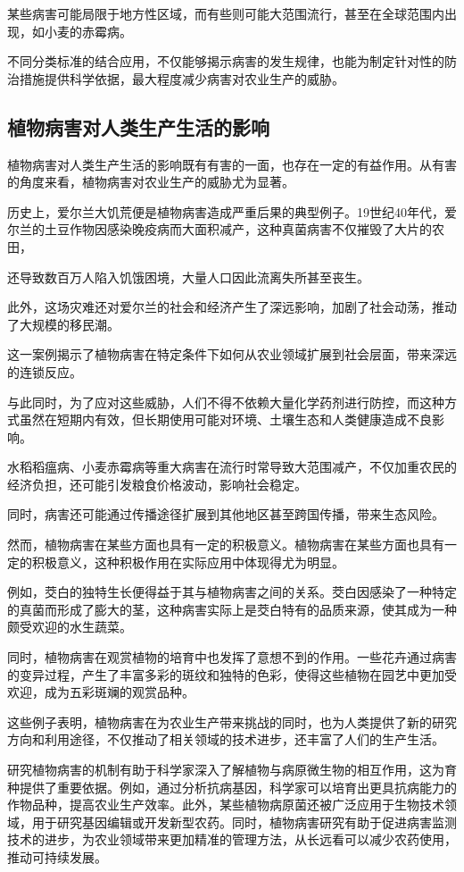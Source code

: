 \documentclass[AutoFakeBold]{LZUThesis-PgD&PhD}
\begin{document}
某些病害可能局限于地方性区域，而有些则可能大范围流行，甚至在全球范围内出现，如小麦的赤霉病。


不同分类标准的结合应用，不仅能够揭示病害的发生规律，也能为制定针对性的防治措施提供科学依据，最大程度减少病害对农业生产的威胁。

\subsection{植物病害对人类生产生活的影响}

植物病害对人类生产生活的影响既有有害的一面，也存在一定的有益作用。从有害的角度来看，植物病害对农业生产的威胁尤为显著。

历史上，爱尔兰大饥荒便是植物病害造成严重后果的典型例子。19世纪40年代，爱尔兰的土豆作物因感染晚疫病而大面积减产，这种真菌病害不仅摧毁了大片的农田，

还导致数百万人陷入饥饿困境，大量人口因此流离失所甚至丧生。


此外，这场灾难还对爱尔兰的社会和经济产生了深远影响，加剧了社会动荡，推动了大规模的移民潮。


这一案例揭示了植物病害在特定条件下如何从农业领域扩展到社会层面，带来深远的连锁反应。

与此同时，为了应对这些威胁，人们不得不依赖大量化学药剂进行防控，而这种方式虽然在短期内有效，但长期使用可能对环境、土壤生态和人类健康造成不良影响。

水稻稻瘟病、小麦赤霉病等重大病害在流行时常导致大范围减产，不仅加重农民的经济负担，还可能引发粮食价格波动，影响社会稳定。

同时，病害还可能通过传播途径扩展到其他地区甚至跨国传播，带来生态风险。

然而，植物病害在某些方面也具有一定的积极意义。植物病害在某些方面也具有一定的积极意义，这种积极作用在实际应用中体现得尤为明显。

例如，茭白的独特生长便得益于其与植物病害之间的关系。茭白因感染了一种特定的真菌而形成了膨大的茎，这种病害实际上是茭白特有的品质来源，使其成为一种颇受欢迎的水生蔬菜。

同时，植物病害在观赏植物的培育中也发挥了意想不到的作用。一些花卉通过病害的变异过程，产生了丰富多彩的斑纹和独特的色彩，使得这些植物在园艺中更加受欢迎，成为五彩斑斓的观赏品种。

这些例子表明，植物病害在为农业生产带来挑战的同时，也为人类提供了新的研究方向和利用途径，不仅推动了相关领域的技术进步，还丰富了人们的生产生活。

研究植物病害的机制有助于科学家深入了解植物与病原微生物的相互作用，这为育种提供了重要依据。例如，通过分析抗病基因，科学家可以培育出更具抗病能力的作物品种，提高农业生产效率。此外，某些植物病原菌还被广泛应用于生物技术领域，用于研究基因编辑或开发新型农药。同时，植物病害研究有助于促进病害监测技术的进步，为农业领域带来更加精准的管理方法，从长远看可以减少农药使用，推动可持续发展。
\end{document}
